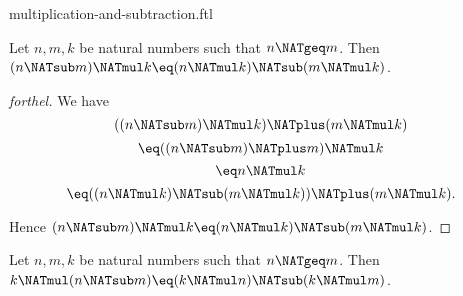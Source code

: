 \documentclass{naproche-library}
\begin{document}
\begin{smodule}[title=Multiplication and Subtraction]{multiplication-and-subtraction.ftl}

\begin{proposition}[forthel,id=ARITHMETIC_06_5458841930039296]
  Let $n, m, k$ be natural numbers such that $n \NATgeq m$.
  Then $(n \NATsub m) \NATmul k \eq (n \NATmul k) \NATsub (m \NATmul k)$.
\end{proposition}
\begin{proof}[forthel]
  We have
  \[  ((n \NATsub m) \NATmul k) \NATplus (m \NATmul k)                 \]
  \[    \eq ((n \NATsub m) \NATplus m) \NATmul k                       \]
  \[    \eq n \NATmul k                                   \]
  \[    \eq ((n \NATmul k) \NATsub (m \NATmul k)) \NATplus (m \NATmul k).  \]

  Hence $(n \NATsub m) \NATmul k \eq (n \NATmul k) \NATsub (m \NATmul k)$.
\end{proof}

\begin{corollary}[forthel,id=ARITHMETIC_06_8461123277815808]
  Let $n, m, k$ be natural numbers such that $n \NATgeq m$.
  Then $k \NATmul (n \NATsub m) \eq (k \NATmul n) \NATsub (k \NATmul m)$.
\end{corollary}
\end{smodule}
\end{document}
